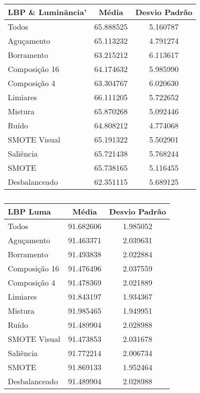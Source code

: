 \begin{table}[!htbp]
\centering
\caption{}
\label{tab:resultados:x:melhor}
\begin{tabular}{|l|c|c|}
\hline
\textbf{LBP  \& Luminância'} & \textbf{Média}     & \textbf{Desvio Padrão} \\ \hline
   Todos        &  65.888525 &  5.160787  \\ \hline
  Aguçamento    &  65.113232 &  4.791274  \\ \hline
  Borramento    &  63.215212 &  6.113617  \\ \hline
  Composição 16 &  64.174632 &  5.985990  \\ \hline
  Composição 4  &  63.304767 &  6.020630  \\ \hline
  Limiares      &  66.111205 &  5.722652  \\ \hline
  Mistura       &  65.870268 &  5.092446  \\ \hline
  Ruído         &  64.808212 &  4.774068  \\ \hline
  SMOTE Visual  &  65.191322 &  5.502901  \\ \hline
  Saliência     &  65.721438 &  5.768244  \\ \hline
 SMOTE          &  65.738165 &  5.116455  \\ \hline
Desbalanceado   &  62.351115 &  5.689125  \\ \hline
\end{tabular}
\end{table}


\begin{table}[!htbp]
\centering
\caption{}
\label{tab:resultados:x:melhor}
\begin{tabular}{|l|c|c|}
\hline
\textbf{LBP Luma} & \textbf{Média}     & \textbf{Desvio Padrão} \\ \hline
   Todos        &  91.682606 &  1.985052  \\ \hline
  Aguçamento    &  91.463371 &  2.039631  \\ \hline
  Borramento    &  91.493838 &  2.022884  \\ \hline
  Composição 16 &  91.476496 &  2.037559  \\ \hline
  Composição 4  &  91.478369 &  2.021889  \\ \hline
  Limiares      &  91.843197 &  1.934367  \\ \hline
  Mistura       &  91.985465 &  1.949951  \\ \hline
  Ruído         &  91.489904 &  2.028988  \\ \hline
  SMOTE Visual  &  91.473853 &  2.031678  \\ \hline
  Saliência     &  91.772214 &  2.006734  \\ \hline
 SMOTE          &  91.869133 &  1.952464  \\ \hline
Desbalanceado   &  91.489904 &  2.028988  \\ \hline
\end{tabular}
\end{table}

